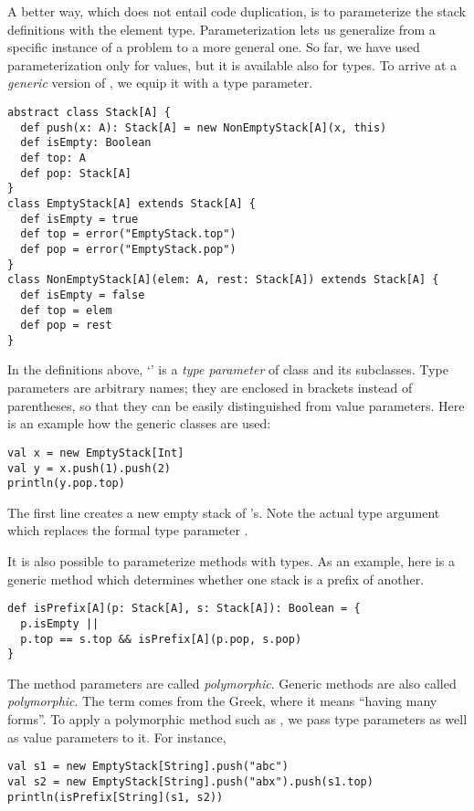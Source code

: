 A better way, which does not entail code duplication, is to
parameterize the stack definitions with the element type.
Parameterization lets us generalize from a specific instance of a
problem to a more general one. So far, we have used parameterization
only for values, but it is available also for types. To arrive at a
{\em generic} version of , we equip it with a type
parameter.
\begin{lstlisting}
abstract class Stack[A] {
  def push(x: A): Stack[A] = new NonEmptyStack[A](x, this)
  def isEmpty: Boolean
  def top: A
  def pop: Stack[A]
}
class EmptyStack[A] extends Stack[A] {
  def isEmpty = true
  def top = error("EmptyStack.top")
  def pop = error("EmptyStack.pop")
}
class NonEmptyStack[A](elem: A, rest: Stack[A]) extends Stack[A] {
  def isEmpty = false
  def top = elem
  def pop = rest
}
\end{lstlisting}
In the definitions above, `' is a {\em type parameter} of
class  and its subclasses.  Type parameters are arbitrary
names; they are enclosed in brackets instead of parentheses, so that
they can be easily distinguished from value parameters.  Here is an
example how the generic classes are used:
\begin{lstlisting}
val x = new EmptyStack[Int]
val y = x.push(1).push(2)
println(y.pop.top)
\end{lstlisting}
The first line creates a new empty stack of 's. Note the
actual type argument \code{[Int]} which replaces the formal type
parameter .

It is also possible to parameterize methods with types. As an example,
here is a generic method which determines whether one stack is a
prefix of another.
\begin{lstlisting}
def isPrefix[A](p: Stack[A], s: Stack[A]): Boolean = {
  p.isEmpty ||
  p.top == s.top && isPrefix[A](p.pop, s.pop)
}
\end{lstlisting}  
The method parameters are called {\em polymorphic}.  Generic methods are
also called {\em polymorphic}.  The term comes from the Greek, where it
means ``having many forms''.  To apply a polymorphic method such as
, we pass type parameters as well as value parameters
to it. For instance,
\begin{lstlisting}
val s1 = new EmptyStack[String].push("abc")
val s2 = new EmptyStack[String].push("abx").push(s1.top)
println(isPrefix[String](s1, s2))
\end{lstlisting}

